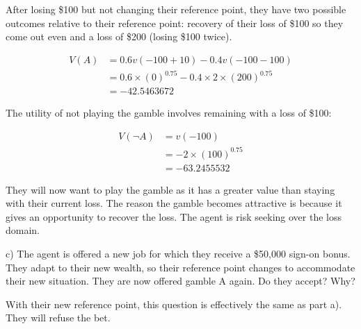 \documentclass[
  letterpaper,
  DIV=11,
  numbers=noendperiod]{scrreprt}
\begin{document}
\begin{tcolorbox}[enhanced jigsaw, title=\textcolor{quarto-callout-tip-color}{\faLightbulb}\hspace{0.5em}{Answer}, toprule=.15mm, colback=white, breakable, titlerule=0mm, colframe=quarto-callout-tip-color-frame, coltitle=black, opacityback=0, rightrule=.15mm, colbacktitle=quarto-callout-tip-color!10!white, bottomtitle=1mm, opacitybacktitle=0.6, arc=.35mm, bottomrule=.15mm, toptitle=1mm, leftrule=.75mm, left=2mm]

After losing \$100 but not changing their reference point, they have two
possible outcomes relative to their reference point: recovery of their
loss of \$100 so they come out even and a loss of \$200 (losing \$100
twice).

\begin{align*}
V(A)&=0.6v(-100+10)-0.4v(-100-100) \\
&=0.6\times (0)^{0.75}-0.4\times 2\times (200)^{0.75} \\
&=-42.5463672
\end{align*}

The utility of not playing the gamble involves remaining with a loss of
\$100:

\begin{align*}
V(\neg A)&=v(-100) \\
&=-2\times (100)^{0.75} \\
&=-63.2455532
\end{align*}

They will now want to play the gamble as it has a greater value than
staying with their current loss. The reason the gamble becomes
attractive is because it gives an opportunity to recover the loss. The
agent is risk seeking over the loss domain.

\end{tcolorbox}

c) The agent is offered a new job for which they receive a \$50,000
sign-on bonus. They adapt to their new wealth, so their reference point
changes to accommodate their new situation. They are now offered gamble
A again. Do they accept? Why?

\begin{tcolorbox}[enhanced jigsaw, title=\textcolor{quarto-callout-tip-color}{\faLightbulb}\hspace{0.5em}{Answer}, toprule=.15mm, colback=white, breakable, titlerule=0mm, colframe=quarto-callout-tip-color-frame, coltitle=black, opacityback=0, rightrule=.15mm, colbacktitle=quarto-callout-tip-color!10!white, bottomtitle=1mm, opacitybacktitle=0.6, arc=.35mm, bottomrule=.15mm, toptitle=1mm, leftrule=.75mm, left=2mm]

With their new reference point, this question is effectively the same as
part a). They will refuse the bet.

\end{tcolorbox}
\end{document}

